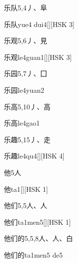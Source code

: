 \begin{entry}{乐队}{5,4}{⼃、⾩}
  \begin{phonetics}{乐队}{yue4 dui4}[][HSK 3]
  \end{phonetics}
\end{entry}

\begin{entry}{乐观}{5,6}{⼃、⾒}
  \begin{phonetics}{乐观}{le4guan1}[][HSK 3]
  \end{phonetics}
\end{entry}

\begin{entry}{乐园}{5,7}{⼃、⼞}
  \begin{phonetics}{乐园}{le4yuan2}
  \end{phonetics}
\end{entry}

\begin{entry}{乐高}{5,10}{⼃、⾼}
  \begin{phonetics}{乐高}{le4gao1}
  \end{phonetics}
\end{entry}

\begin{entry}{乐趣}{5,15}{⼃、⾛}
  \begin{phonetics}{乐趣}{le4qu4}[][HSK 4]
  \end{phonetics}
\end{entry}

\begin{entry}{他}{5}{⼈}
  \begin{phonetics}{他}{ta1}[][HSK 1]
  \end{phonetics}
\end{entry}

\begin{entry}{他们}{5,5}{⼈、⼈}
  \begin{phonetics}{他们}{ta1men5}[][HSK 1]
  \end{phonetics}
\end{entry}

\begin{entry}{他们的}{5,5,8}{⼈、⼈、⽩}
  \begin{phonetics}{他们的}{ta1men5 de5}
  \end{phonetics}
\end{entry}

